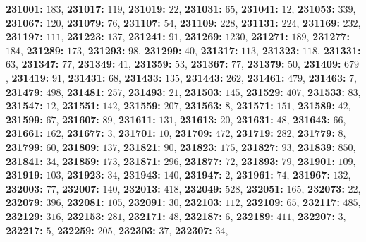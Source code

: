 \textsf{\bfseries 231001:} $183$, \textsf{\bfseries 231017:} $119$, \textsf{\bfseries 231019:} $22$, \textsf{\bfseries 231031:} $65$, \textsf{\bfseries 231041:} $12$, \textsf{\bfseries 231053:} $339$, \textsf{\bfseries 231067:} $120$, \textsf{\bfseries 231079:} $76$, \textsf{\bfseries 231107:} $54$, \textsf{\bfseries 231109:} $228$, \textsf{\bfseries 231131:} $224$, \textsf{\bfseries 231169:} $232$, \textsf{\bfseries 231197:} $111$, \textsf{\bfseries 231223:} $137$, \textsf{\bfseries 231241:} $91$, \textsf{\bfseries 231269:} $1230$, \textsf{\bfseries 231271:} $189$, \textsf{\bfseries 231277:} $184$, \textsf{\bfseries 231289:} $173$, \textsf{\bfseries 231293:} $98$, \textsf{\bfseries 231299:} $40$, \textsf{\bfseries 231317:} $113$, \textsf{\bfseries 231323:} $118$, \textsf{\bfseries 231331:} $63$, \textsf{\bfseries 231347:} $77$, \textsf{\bfseries 231349:} $41$, \textsf{\bfseries 231359:} $53$, \textsf{\bfseries 231367:} $77$, \textsf{\bfseries 231379:} $50$, \textsf{\bfseries 231409:} $679$, \textsf{\bfseries 231419:} $91$, \textsf{\bfseries 231431:} $68$, \textsf{\bfseries 231433:} $135$, \textsf{\bfseries 231443:} $262$, \textsf{\bfseries 231461:} $479$, \textsf{\bfseries 231463:} $7$, \textsf{\bfseries 231479:} $498$, \textsf{\bfseries 231481:} $257$, \textsf{\bfseries 231493:} $21$, \textsf{\bfseries 231503:} $145$, \textsf{\bfseries 231529:} $407$, \textsf{\bfseries 231533:} $83$, \textsf{\bfseries 231547:} $12$, \textsf{\bfseries 231551:} $142$, \textsf{\bfseries 231559:} $207$, \textsf{\bfseries 231563:} $8$, \textsf{\bfseries 231571:} $151$, \textsf{\bfseries 231589:} $42$, \textsf{\bfseries 231599:} $67$, \textsf{\bfseries 231607:} $89$, \textsf{\bfseries 231611:} $131$, \textsf{\bfseries 231613:} $20$, \textsf{\bfseries 231631:} $48$, \textsf{\bfseries 231643:} $66$, \textsf{\bfseries 231661:} $162$, \textsf{\bfseries 231677:} $3$, \textsf{\bfseries 231701:} $10$, \textsf{\bfseries 231709:} $472$, \textsf{\bfseries 231719:} $282$, \textsf{\bfseries 231779:} $8$, \textsf{\bfseries 231799:} $60$, \textsf{\bfseries 231809:} $137$, \textsf{\bfseries 231821:} $90$, \textsf{\bfseries 231823:} $175$, \textsf{\bfseries 231827:} $93$, \textsf{\bfseries 231839:} $850$, \textsf{\bfseries 231841:} $34$, \textsf{\bfseries 231859:} $173$, \textsf{\bfseries 231871:} $296$, \textsf{\bfseries 231877:} $72$, \textsf{\bfseries 231893:} $79$, \textsf{\bfseries 231901:} $109$, \textsf{\bfseries 231919:} $103$, \textsf{\bfseries 231923:} $34$, \textsf{\bfseries 231943:} $140$, \textsf{\bfseries 231947:} $2$, \textsf{\bfseries 231961:} $74$, \textsf{\bfseries 231967:} $132$, \textsf{\bfseries 232003:} $77$, \textsf{\bfseries 232007:} $140$, \textsf{\bfseries 232013:} $418$, \textsf{\bfseries 232049:} $528$, \textsf{\bfseries 232051:} $165$, \textsf{\bfseries 232073:} $22$, \textsf{\bfseries 232079:} $396$, \textsf{\bfseries 232081:} $105$, \textsf{\bfseries 232091:} $30$, \textsf{\bfseries 232103:} $112$, \textsf{\bfseries 232109:} $65$, \textsf{\bfseries 232117:} $485$, \textsf{\bfseries 232129:} $316$, \textsf{\bfseries 232153:} $281$, \textsf{\bfseries 232171:} $48$, \textsf{\bfseries 232187:} $6$, \textsf{\bfseries 232189:} $411$, \textsf{\bfseries 232207:} $3$, \textsf{\bfseries 232217:} $5$, \textsf{\bfseries 232259:} $205$, \textsf{\bfseries 232303:} $37$, \textsf{\bfseries 232307:} $34$, 
